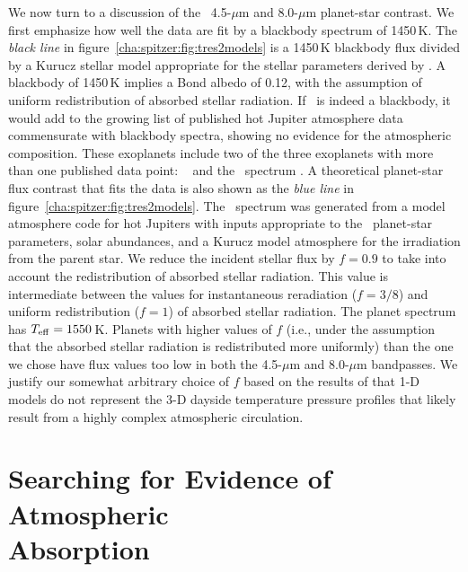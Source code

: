 We now turn to a discussion of the \tresTwo\ 4.5-$\mu$m and 8.0-$\mu$m planet-star contrast.
We first emphasize how well the data are fit by a blackbody spectrum of 1450\,K.
The {\it black line} in figure~\ref{cha:spitzer:fig:tres2models} is a 1450\,K blackbody flux divided by a Kurucz stellar model appropriate for the stellar parameters derived by \citet{Sozzetti_Torres_Charbonneau:apj:2007a}.
A blackbody of 1450\,K implies a Bond albedo of 0.12, with the assumption of uniform redistribution of absorbed stellar radiation.
If \tresTwo\ is indeed a blackbody, it would add to the growing list of published hot Jupiter atmosphere data commensurate with blackbody spectra, showing no evidence for the atmospheric composition.
These exoplanets include two of the three exoplanets with more than one published data point: \tresOne\ \citep{Charbonneau_Allen_Megeath:apj:2005a} and the \hdOENb\ spectrum \citep{Grillmair_Charbonneau_Burrows:apjl:2007a}.
A theoretical planet-star flux contrast that fits the data is also shown as the {\it blue line} in figure~\ref{cha:spitzer:fig:tres2models}.
The \tresTwo\ spectrum was generated from a model atmosphere code for hot Jupiters \citep{Seager_Richardson_Hansen:apj:2005a} with inputs appropriate to the \tresTwo\ planet-star parameters, solar abundances, and a Kurucz model atmosphere for the irradiation from the parent star.
We reduce the incident stellar flux by \mbox{$f=0.9$} to take into account the redistribution of absorbed stellar radiation.
This value is intermediate between the values for instantaneous reradiation (\mbox{$f=3/8$}) and uniform redistribution (\mbox{$f=1$}) of absorbed stellar radiation.
The planet spectrum has \mbox{$T_{\rm eff}=1550$\,K}.
Planets with higher values of $f$ (i.e., under the assumption that the absorbed stellar radiation is redistributed more uniformly) than the one we chose have flux values too low in both the 4.5-$\mu$m and 8.0-$\mu$m bandpasses.
We justify our somewhat arbitrary choice of $f$ based on the results of \citet{Fortney_Cooper_Showman:apj:2006a} that 1-D models do not represent the 3-D dayside temperature pressure profiles that likely result from a highly complex atmospheric circulation.

\section[Searching for Evidence of Atmospheric Absorption]{Searching for Evidence of Atmospheric \\ Absorption}
\label{cha:spitzer:sec:discuss}


